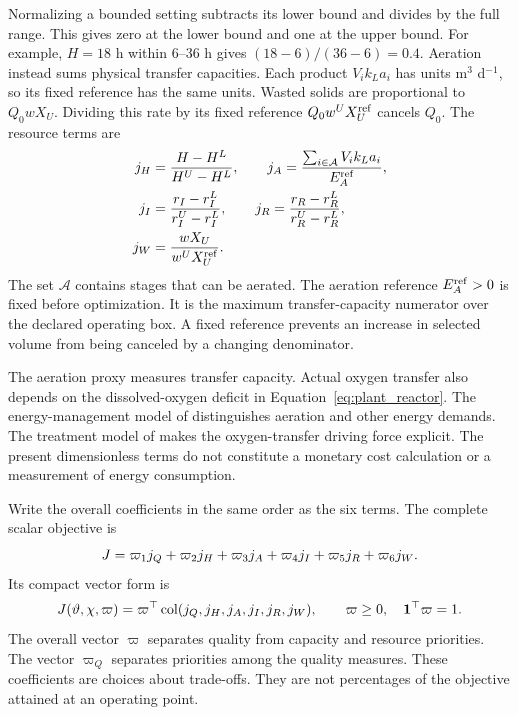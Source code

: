 Normalizing a bounded setting subtracts its lower bound and divides by the full range. This gives zero at the lower bound and one at the upper bound. For example, $H=18$ h within 6--36 h gives $(18-6)/(36-6)=0.4$. Aeration instead sums physical transfer capacities. Each product $V_i k_La_i$ has units m$^3$ d$^{-1}$, so its fixed reference has the same units. Wasted solids are proportional to $Q_0wX_U$. Dividing this rate by its fixed reference $Q_0w^UX_U^{\rm ref}$ cancels $Q_0$. The resource terms are
\begin{align}
\equationname{Normalized retention-time and aeration objective terms}
j_H&=\frac{H-H^L}{H^U-H^L},\qquad
j_A=\frac{\sum_{i\in\mathcal A}V_i k_La_i}{E_A^{\rm ref}},\\
\equationname{Normalized mixed-liquor and return-sludge recycle objective terms}
j_I&=\frac{r_I-r_I^L}{r_I^U-r_I^L},\qquad
j_R=\frac{r_R-r_R^L}{r_R^U-r_R^L},\\
\equationname{Normalized waste-solids objective term}
j_W&=\frac{wX_U}{w^UX_U^{\rm ref}}.
\label{eq:plant_resource_objective}
\end{align}
The set $\mathcal A$ contains stages that can be aerated. The aeration reference $E_A^{\rm ref}>0$ is fixed before optimization. It is the maximum transfer-capacity numerator over the declared operating box. A fixed reference prevents an increase in selected volume from being canceled by a changing denominator.

The aeration proxy measures transfer capacity. Actual oxygen transfer also depends on the dissolved-oxygen deficit in Equation~\eqref{eq:plant_reactor}. The energy-management model of \citet{Miederer2025} distinguishes aeration and other energy demands. The treatment model of \citet{Zhang2026} makes the oxygen-transfer driving force explicit. The present dimensionless terms do not constitute a monetary cost calculation or a measurement of energy consumption.

Write the overall coefficients in the same order as the six terms. The complete scalar objective is
\begin{equation}
\equationname{Scalar expansion of the six-term engineering objective}
J=\varpi_1j_Q+\varpi_2j_H+\varpi_3j_A+\varpi_4j_I+\varpi_5j_R+\varpi_6j_W.
\end{equation}
Its compact vector form is
\begin{equation}
\equationname{Vector engineering objective and normalized priority weights}
J(\vartheta,\chi,\varpi)=\varpi^\top
\operatorname{col}(j_Q,j_H,j_A,j_I,j_R,j_W),\qquad
\varpi\ge0,\quad\mathbf1^\top\varpi=1.
\label{eq:plant_engineering_objective}
\end{equation}
The overall vector $\varpi$ separates quality from capacity and resource priorities. The vector $\varpi_Q$ separates priorities among the quality measures. These coefficients are choices about trade-offs. They are not percentages of the objective attained at an operating point.

